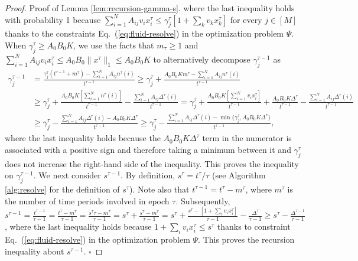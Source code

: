 \documentclass[opre]{informs3aa}
\begin{document}
\begin{proof}{Proof of Lemma \ref{lem:recursion-gamma-s}.}
where the last inequality holds with probability 1 because $\sum_{i=1}^N A_{ij}v_ix^\tau_i\leq \gamma^\tau_j[1+\sum_k v_kx^\tau_k]$ for every $j\in[M]$
thanks to the constraints Eq.~(\ref{eq:fluid-resolve}) in the optimization problem $\Psi$. 
When $\gamma^\tau_j\geq A_0B_0K$, we use the facts that $m_\tau\geq 1$ and $\sum_{i=1}^NA_{ij}v_ix^\tau_i \leq A_0B_0\|x^\tau\|_1 \leq A_0B_0K$
to alternatively decompose $\gamma^{\tau-1}_j$ as
\begin{align*}
\gamma^{\tau-1}_j &= \frac{\gamma^\tau_j(t^{\tau-1}+m^\tau)-\sum_{i=1}^NA_{ij}n^\tau(i)}{t^{\tau-1}}
\geq \gamma^\tau_j +  \frac{A_0B_0K m^\tau - \sum_{i=1}^NA_{ij}n^\tau(i)}{t^{\tau-1}}\\
&\geq \gamma^\tau_j + \frac{A_0B_0K [\sum_{i=1}^N n^\tau(i)]}{t^{\tau-1}}- \frac{\sum_{i=1}^NA_{ij}\Delta^\tau(i)}{t^{\tau-1}}
= \gamma^\tau_j + \frac{A_0B_0 K[\sum_{i=1}^Nv_ix_i^\tau]}{t^{\tau-1}}  + \frac{A_0B_0K\Delta^\tau}{t^{\tau-1}}-\frac{\sum_{i=1}^NA_{ij}\Delta^\tau(i)}{t^{\tau-1}}\\
&\geq \gamma^\tau_j - \frac{\sum_{i=1}^NA_{ij}\Delta^\tau(i) - A_0B_0K\Delta^\tau}{t^{\tau-1}} \geq  \gamma^\tau_j - \frac{\sum_{i=1}^NA_{ij}\Delta^\tau(i) - \min\{\gamma_j^\tau,A_0B_0K\Delta^\tau\}}{t^{\tau-1}},
\end{align*}
where the last inequality holds because the $A_0B_0K\Delta^\tau$ term in the numerator is associated with a positive sign and therefore taking a minimum between it and $\gamma_j^\tau$ does not increase the right-hand side of the inequality.
This proves the inequality on $\gamma^{\tau-1}_j$.
We next consider $s^{\tau-1}$. {By definition, $s^\tau=t^\tau/\tau$ (see Algorithm \ref{alg:resolve} for the definition of $s^\tau$).
Note also that $t^{\tau-1}=t^\tau-m^\tau$, where $m^\tau$ is the number of time periods involved in epoch $\tau$. Subsequently,
$s^{\tau-1} =\frac{t^{\tau-1}}{\tau-1} = \frac{t^\tau-m^\tau}{\tau-1}= \frac{s^\tau \tau - m^\tau}{\tau-1} = s^\tau + \frac{s^\tau-m^\tau}{\tau-1} = s^\tau + \frac{s^\tau - [1+\sum_i v_ix^\tau_i]}{\tau-1} - \frac{\Delta^\tau}{\tau-1}\geq s^{\tau} - \frac{\Delta^{\tau-1}}{\tau-1}$,}
where the last inequality holds because $1+\sum_i v_ix^\tau_i\leq s^\tau$ thanks to constraint Eq.~(\ref{eq:fluid-resolve}) in the optimization problem $\Psi$.
This proves the recursion inequality about $s^{\tau-1}$.
$\square$
\end{proof}
\end{document}
